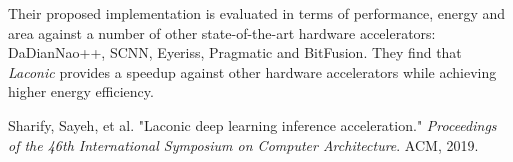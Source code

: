 \documentclass[12pt]{article}
\begin{document}
Their proposed implementation is evaluated in terms of performance, energy and area against a number of other state-of-the-art hardware accelerators: DaDianNao++, SCNN, Eyeriss, Pragmatic and BitFusion. They find that \emph{Laconic} provides a speedup against other hardware accelerators while achieving higher energy efficiency.


\begin{thebibliography}{9}
Sharify, Sayeh, et al. "Laconic deep learning inference acceleration." \emph{Proceedings of the 46th International Symposium on Computer Architecture}. ACM, 2019.

\end{thebibliography}
 
\end{document}
